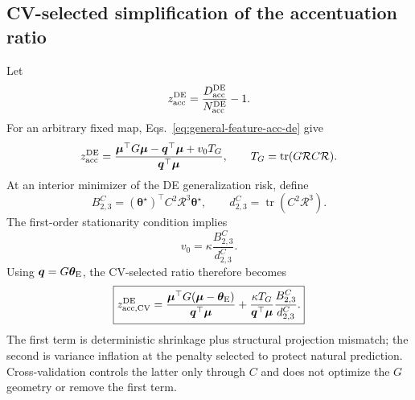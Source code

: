\documentclass[11pt]{article}
\newcommand{\tr}{\operatorname{tr}}
\newcommand{\tstar}{\bm\theta^{\star}}
\begin{document}
\subsection{CV-selected simplification of the accentuation ratio}

Let
\begin{equation}
  z_{\rm acc}^{\rm DE}
  =\frac{D_{\rm acc}^{\rm DE}}{N_{\rm acc}^{\rm DE}}-1.
\end{equation}
For an arbitrary fixed map, Eqs.~\eqref{eq:general-feature-acc-de} give
\begin{equation}
  z_{\rm acc}^{\rm DE}
  =\frac{\bm\mu^{\top}G\bm\mu-\bm q^{\top}\bm\mu
          +v_0T_G}
         {\bm q^{\top}\bm\mu},
  \qquad
  T_G=\tr(G\mathcal R C\mathcal R).
  \label{eq:general-feature-z}
\end{equation}
At an interior minimizer of the DE generalization risk, define
\begin{equation}
  B_{2,3}^{C}=(\tstar)^{\top}C^2\mathcal R^3\tstar,
  \qquad
  d_{2,3}^{C}=\tr(C^2\mathcal R^3).
\end{equation}
The first-order stationarity condition implies
\begin{equation}
  v_0=\kappa\frac{B_{2,3}^{C}}{d_{2,3}^{C}}.
  \label{eq:cv-v0-stationarity}
\end{equation}
Using $\bm q=G\bm\theta_{\rm E}$, the CV-selected ratio therefore becomes
\begin{equation}
  \boxed{
  z_{\rm acc,CV}^{\rm DE}
  =\frac{\bm\mu^{\top}G(\bm\mu-\bm\theta_{\rm E})}
         {\bm q^{\top}\bm\mu}
   +\frac{\kappa T_G}{\bm q^{\top}\bm\mu}
      \frac{B_{2,3}^{C}}{d_{2,3}^{C}}.}
  \label{eq:general-feature-z-cv}
\end{equation}
The first term is deterministic shrinkage plus structural projection mismatch;
the second is variance inflation at the penalty selected to protect natural
prediction.  Cross-validation controls the latter only through $C$ and does
not optimize the $G$ geometry or remove the first term.
\end{document}
